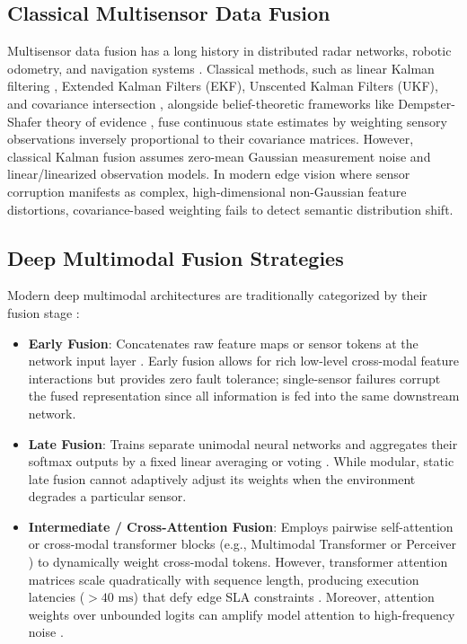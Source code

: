 \documentclass[conference]{IEEEtran}
\begin{document}
\subsection{Classical Multisensor Data Fusion}
Multisensor data fusion has a long history in distributed radar networks, robotic odometry, and navigation systems \cite{khaleghi2013multisensor, liggins2008handbook, hall1997introduction}. Classical methods, such as linear Kalman filtering \cite{kalman1960new}, Extended Kalman Filters (EKF), Unscented Kalman Filters (UKF), and covariance intersection \cite{julier2000new}, alongside belief-theoretic frameworks like Dempster-Shafer theory of evidence \cite{dempster1967upper, shafer1976mathematical}, fuse continuous state estimates by weighting sensory observations inversely proportional to their covariance matrices. However, classical Kalman fusion assumes zero-mean Gaussian measurement noise and linear/linearized observation models. In modern edge vision where sensor corruption manifests as complex, high-dimensional non-Gaussian feature distortions, covariance-based weighting fails to detect semantic distribution shift.

\subsection{Deep Multimodal Fusion Strategies}
Modern deep multimodal architectures are traditionally categorized by their fusion stage \cite{baltrusaitis2018multimodal, ramachandram2017deep}:
\begin{itemize}
    \item \textbf{Early Fusion}: Concatenates raw feature maps or sensor tokens at the network input layer \cite{baltrusaitis2018multimodal}. Early fusion allows for rich low-level cross-modal feature interactions but provides zero fault tolerance; single-sensor failures corrupt the fused representation since all information is fed into the same downstream network.
    \item \textbf{Late Fusion}: Trains separate unimodal neural networks and aggregates their softmax outputs by a fixed linear averaging or voting \cite{khaleghi2013multisensor}. While modular, static late fusion cannot adaptively adjust its weights when the environment degrades a particular sensor.
    \item \textbf{Intermediate / Cross-Attention Fusion}: Employs pairwise self-attention \cite{vaswani2017attention} or cross-modal transformer blocks (e.g., Multimodal Transformer \cite{tsai2019multimodal} or Perceiver \cite{jaegle2021perceiver}) to dynamically weight cross-modal tokens. However, transformer attention matrices scale quadratically with sequence length, producing execution latencies ($>40\text{ ms}$) that defy edge SLA constraints \cite{kumar2026scholar23}. Moreover, attention weights over unbounded logits can amplify model attention to high-frequency noise \cite{guo2017calibration}.
\end{itemize}
\end{document}
